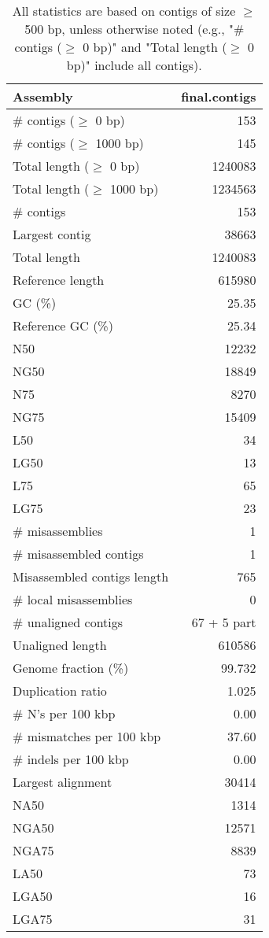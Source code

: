\documentclass[12pt,a4paper]{article}
\begin{document}
\begin{table}[ht]
\begin{center}
\caption{All statistics are based on contigs of size $\geq$ 500 bp, unless otherwise noted (e.g., "\# contigs ($\geq$ 0 bp)" and "Total length ($\geq$ 0 bp)" include all contigs).}
\begin{tabular}{|l*{1}{|r}|}
\hline
Assembly & final.contigs \\ \hline
\# contigs ($\geq$ 0 bp) & 153 \\ \hline
\# contigs ($\geq$ 1000 bp) & 145 \\ \hline
Total length ($\geq$ 0 bp) & 1240083 \\ \hline
Total length ($\geq$ 1000 bp) & 1234563 \\ \hline
\# contigs & 153 \\ \hline
Largest contig & 38663 \\ \hline
Total length & 1240083 \\ \hline
Reference length & 615980 \\ \hline
GC (\%) & 25.35 \\ \hline
Reference GC (\%) & 25.34 \\ \hline
N50 & 12232 \\ \hline
NG50 & 18849 \\ \hline
N75 & 8270 \\ \hline
NG75 & 15409 \\ \hline
L50 & 34 \\ \hline
LG50 & 13 \\ \hline
L75 & 65 \\ \hline
LG75 & 23 \\ \hline
\# misassemblies & 1 \\ \hline
\# misassembled contigs & 1 \\ \hline
Misassembled contigs length & 765 \\ \hline
\# local misassemblies & 0 \\ \hline
\# unaligned contigs & 67 + 5 part \\ \hline
Unaligned length & 610586 \\ \hline
Genome fraction (\%) & 99.732 \\ \hline
Duplication ratio & 1.025 \\ \hline
\# N's per 100 kbp & 0.00 \\ \hline
\# mismatches per 100 kbp & 37.60 \\ \hline
\# indels per 100 kbp & 0.00 \\ \hline
Largest alignment & 30414 \\ \hline
NA50 & 1314 \\ \hline
NGA50 & 12571 \\ \hline
NGA75 & 8839 \\ \hline
LA50 & 73 \\ \hline
LGA50 & 16 \\ \hline
LGA75 & 31 \\ \hline
\end{tabular}
\end{center}
\end{table}
\end{document}
